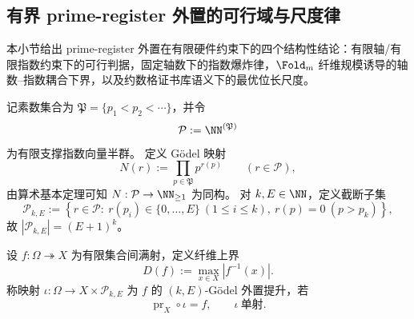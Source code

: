 \subsection{有界 prime-register 外置的可行域与尺度律}\label{subsec:conclusion-bounded-prime-register-godel-scaling}
本小节给出 prime-register 外置在有限硬件约束下的四个结构性结论：有限轴/有限指数约束下的可行判据，固定轴数下的指数爆炸律，\(\Fold_m\) 纤维规模诱导的轴数--指数耦合下界，以及约数格证书库语义下的最优位长尺度。

\begin{definition}\label{def:conclusion-truncated-prime-register}
记素数集合为 \(\mathfrak P=\{p_1<p_2<\cdots\}\)，并令
\[
\mathcal P:=\NN^{(\mathfrak P)}
\]
为有限支撑指数向量半群。
定义 Gödel 映射
\[
N(r):=\prod_{p\in\mathfrak P} p^{r(p)}\qquad (r\in\mathcal P),
\]
由算术基本定理可知 \(N:\mathcal P\to\NN_{\ge 1}\) 为同构。
对 \(k,E\in\NN\)，定义截断子集
\[
\mathcal P_{k,E}
:=\left\{
r\in\mathcal P:\ r(p_i)\in\{0,\dots,E\}\ (1\le i\le k),\ r(p)=0\ (p>p_k)
\right\},
\]
故 \(|\mathcal P_{k,E}|=(E+1)^k\)。
\end{definition}

\begin{definition}\label{def:conclusion-kE-godel-lift}
设 \(f:\Omega\twoheadrightarrow X\) 为有限集合间满射，定义纤维上界
\[
D(f):=\max_{x\in X}|f^{-1}(x)|.
\]
称映射 \(\iota:\Omega\to X\times\mathcal P_{k,E}\) 为 \(f\) 的 \((k,E)\)-Gödel 外置提升，若
\[
\operatorname{pr}_X\circ\iota=f,\qquad \iota\ \text{单射}.
\]
\end{definition}

